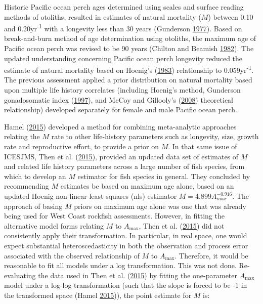 \documentclass[12pt,]{article}
\begin{document}
Historic Pacific ocean perch ages determined using scales and surface
reading methods of otoliths, resulted in estimates of natural mortality
(\(M\)) between 0.10 and 0.20yr\textsuperscript{-1} with a longevity
less than 30 years (Gunderson
\protect\hyperlink{ref-gunderson_population_1977}{1977}). Based on
break-and-burn method of age determination using otoliths, the maximum
age of Pacific ocean perch was revised to be 90 years (Chilton and
Beamish \protect\hyperlink{ref-chilton_age_1982}{1982}). The updated
understanding concerning Pacific ocean perch longevity reduced the
estimate of natural mortality based on Hoenig's
(\protect\hyperlink{ref-hoenig_empirical_1983}{1983}) relationship to
0.059yr\textsuperscript{-1}. The previous assessment applied a prior
distribution on natural mortality based upon multiple life history
correlates (including Hoenig's method, Gunderson gonadosomatic index
(\protect\hyperlink{ref-gunderson_trade-off_1997}{1997}), and McCoy and
Gillooly's (\protect\hyperlink{ref-mccoy_predicting_2008}{2008})
theoretical relationship) developed separately for female and male
Pacific ocean perch.

Hamel (\protect\hyperlink{ref-hamel_method_2015}{2015}) developed a
method for combining meta-analytic approaches relating the \(M\) rate to
other life-history parameters such as longevity, size, growth rate and
reproductive effort, to provide a prior on \(M\). In that same issue of
ICESJMS, Then et al.
(\protect\hyperlink{ref-then_evaluating_2015}{2015}), provided an
updated data set of estimates of \(M\) and related life history
parameters across a large number of fish species, from which to develop
an \(M\) estimator for fish species in general. They concluded by
recommending \(M\) estimates be based on maximum age alone, based on an
updated Hoenig non-linear least squares (nls) estimator
\(M=4.899A^{-0.916}_{max}\). The approach of basing \(M\) priors on
maximum age alone was one that was already being used for West Coast
rockfish assessments. However, in fitting the alternative model forms
relating \(M\) to \(A_{\text{max}}\), Then et al.
(\protect\hyperlink{ref-then_evaluating_2015}{2015}) did not
consistently apply their transformation. In particular, in real space,
one would expect substantial heteroscedasticity in both the observation
and process error associated with the observed relationship of \(M\) to
\(A_{\text{max}}\). Therefore, it would be reasonable to fit all models
under a log transformation. This was not done. Re-evaluating the data
used in Then et al. (\protect\hyperlink{ref-then_evaluating_2015}{2015})
by fitting the one-parameter \(A_{\text{max}}\) model under a log-log
transformation (such that the slope is forced to be -1 in the
transformed space (Hamel
\protect\hyperlink{ref-hamel_method_2015}{2015})), the point estimate
for \(M\) is:
\end{document}
